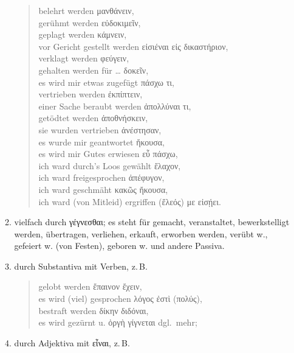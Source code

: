 \begin{enumerate}[leftmargin=0pt,rightmargin=0pt,listparindent =1cm,labelindent=1cm,labelsep=1ex,labelwidth={*},itemindent={*},align=left]
\begin{enumerate}
\begin{quote}
belehrt werden \textgreek[variant=ancient]{μανθάνειν,}\\
gerühmt werden \textgreek[variant=ancient]{εὐδοκιμεῖν,}\\
geplagt werden \textgreek[variant=ancient]{κάμνειν,}\\
vor Gericht gestellt werden \textgreek[variant=ancient]{εἰσιέναι εἰς
δικαστήριον,}\\
verklagt werden \textgreek[variant=ancient]{φεύγειν,}\\
gehalten werden für \ldots{} \textgreek[variant=ancient]{δοκεῖν,}\\
es wird mir etwas zugefügt \textgreek[variant=ancient]{πάσχω τι,}\\
vertrieben werden \textgreek[variant=ancient]{ἐκπίπτειν,}\\
einer Sache beraubt werden \textgreek[variant=ancient]{ἀπολλύναι τι},\\
getödtet werden \textgreek[variant=ancient]{ἀποθνήσκειν},\\
sie wurden vertrieben \textgreek[variant=ancient]{ἀνέστησαν},\\
es wurde mir geantwortet \textgreek[variant=ancient]{ἤκουσα},\\
es wird mir Gutes erwiesen \textgreek[variant=ancient]{εὖ πάσχω},\\
ich ward durch's Loos gewählt \textgreek[variant=ancient]{ἔλαχον},\\
ich ward freigesprochen \textgreek[variant=ancient]{ἀπέφυγον},\\
ich ward geschmäht \textgreek[variant=ancient]{κακῶς ἤκουσα},\\
ich ward (von Mitleid) ergriffen \textgreek[variant=ancient]{(ἔλεός)
με εἰσῄει}.
\end{quote}
\item vielfach durch \textgreek[variant=ancient]{γέγνεσθαι;} es steht für
gemacht, veranstaltet, bewerkstelligt werden, übertragen, verliehen,
erkauft, erworben werden, verübt w., gefeiert w. (von Festen), geboren
w. und andere Passiva.
\item durch Substantiva mit Verben, z.\,B.

\begin{quote}
gelobt werden \textgreek[variant=ancient]{ἔπαινον ἔχειν,}\\
es wird (viel) gesprochen \textgreek[variant=ancient]{λόγος ἐστὶ (πολύς),}\\
bestraft werden \textgreek[variant=ancient]{δίκην διδόναι,}\\
es wird gezürnt u. \textgreek[variant=ancient]{ὀργὴ γίγνεται} dgl.\ mehr;
\end{quote}
\item durch Adjektiva mit \textgreek[variant=ancient]{εἶναι,} z.\,B.


\end{enumerate}
\end{enumerate}
